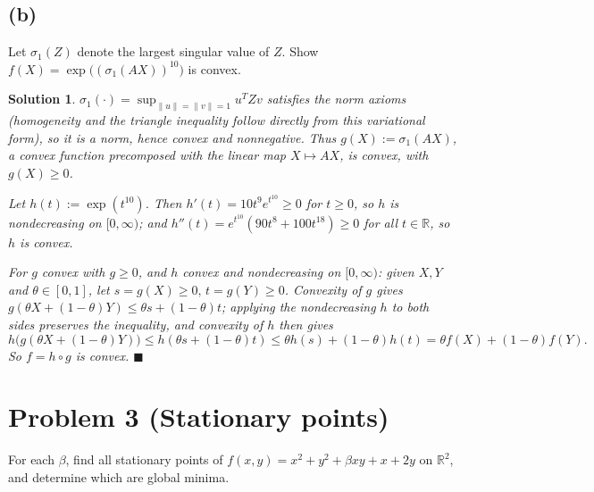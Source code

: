 \documentclass[11pt]{article}
\newcommand{\R}{\mathbb{R}}
\newtheorem*{solution}{Solution}
\begin{document}
\subsection*{(b)}
Let $\sigma_1(Z)$ denote the largest singular value of $Z$. Show $f(X)=\exp\big((\sigma_1(AX))^{10}\big)$ is convex.
\begin{solution}
$\sigma_1(\cdot)=\sup_{\|u\|=\|v\|=1}u^TZv$ satisfies the norm axioms (homogeneity and the triangle inequality follow directly from this variational form), so it is a norm, hence convex and nonnegative. Thus $g(X):=\sigma_1(AX)$, a convex function precomposed with the linear map $X\mapsto AX$, is convex, with $g(X)\ge0$.

Let $h(t):=\exp(t^{10})$. Then $h'(t)=10t^9e^{t^{10}}\ge0$ for $t\ge0$, so $h$ is nondecreasing on $[0,\infty)$; and $h''(t)=e^{t^{10}}(90t^8+100t^{18})\ge0$ for all $t\in\R$, so $h$ is convex.

For $g$ convex with $g\ge0$, and $h$ convex and nondecreasing on $[0,\infty)$: given $X,Y$ and $\theta\in[0,1]$, let $s=g(X)\ge0,\,t=g(Y)\ge0$. Convexity of $g$ gives $g(\theta X+(1-\theta)Y)\le\theta s+(1-\theta)t$; applying the nondecreasing $h$ to both sides preserves the inequality, and convexity of $h$ then gives
\[
h\big(g(\theta X+(1-\theta)Y)\big) \le h(\theta s+(1-\theta)t) \le \theta h(s)+(1-\theta)h(t) = \theta f(X)+(1-\theta)f(Y).
\]
So $f=h\circ g$ is convex. $\blacksquare$
\end{solution}

\section*{Problem 3 (Stationary points)}

For each $\beta$, find all stationary points of $f(x,y)=x^2+y^2+\beta xy+x+2y$ on $\R^2$, and determine which are global minima.
\end{document}
